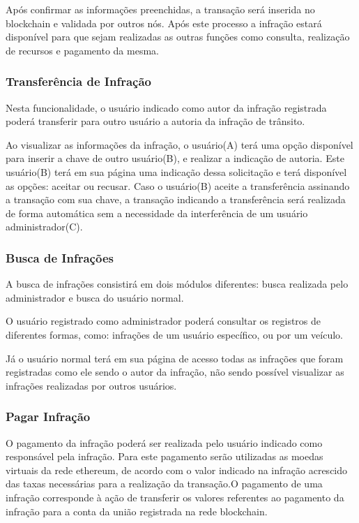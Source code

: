         Após confirmar as informações preenchidas, a transação será inserida no blockchain e validada por outros nós. Após este processo a infração estará disponível para que sejam realizadas as outras funções como consulta, realização de recursos e pagamento da mesma.
        
            
    \subsubsection{Transferência de Infração}
    
        Nesta funcionalidade, o usuário indicado como autor da infração registrada poderá transferir para outro usuário a autoria da infração de trânsito.
        
        Ao visualizar as informações da infração, o usuário(A) terá uma opção disponível para inserir a chave de outro usuário(B), e realizar a indicação de autoria. Este usuário(B) terá em sua página uma indicação dessa solicitação e terá disponível as opções: aceitar ou recusar. Caso o usuário(B) aceite a transferência assinando a transação com sua chave, a transação indicando a transferência será realizada de forma automática sem a necessidade da interferência de um usuário administrador(C).
    
    \subsubsection{Busca de Infrações}
    
        A busca de infrações consistirá em dois módulos diferentes: busca realizada pelo administrador e busca do usuário normal.
        
        O usuário registrado como administrador poderá consultar os registros de diferentes formas, como: infrações de um usuário específico, ou por um veículo.
        
        Já o usuário normal terá em sua página de acesso todas as infrações que foram registradas como ele sendo o autor da infração, não sendo possível visualizar as infrações realizadas por outros usuários.
    
    \subsubsection{Pagar Infração}
    
        O pagamento da infração poderá ser realizada pelo usuário indicado como responsável pela infração. Para este pagamento serão utilizadas as moedas virtuais da rede ethereum, de acordo com o valor indicado na infração acrescido das taxas necessárias para a realização da transação.O pagamento de uma infração corresponde à ação de transferir os valores referentes ao pagamento da infração para a conta da união registrada na rede blockchain.
    
